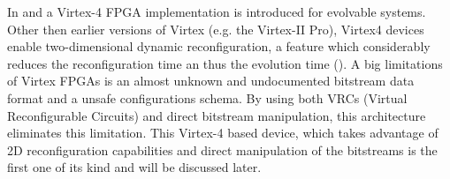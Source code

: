 \label{sec:virtex4}

In \cite{virtex4} and \cite{dpr} a Virtex-4 FPGA implementation is introduced for evolvable systems. Other then earlier versions of Virtex (e.g. the Virtex-II Pro), Virtex4 devices enable two-dimensional dynamic reconfiguration, a feature which considerably reduces the reconfiguration time an thus the evolution time (\cite{virtex4}). A big limitations of Virtex FPGAs is an almost unknown and undocumented bitstream data format and a unsafe configurations schema. By using both VRCs (Virtual Reconfigurable Circuits) and direct bitstream manipulation, this  architecture eliminates this limitation. This Virtex-4 based device, which takes advantage of 2D reconfiguration capabilities and direct manipulation of the bitstreams is the first one of its kind and will be discussed later.